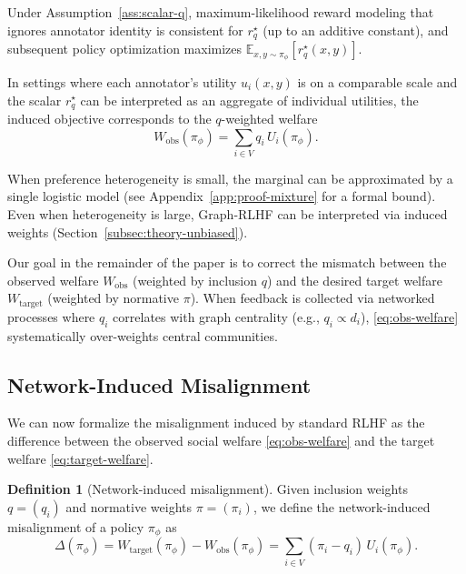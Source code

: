 \documentclass{article}
\theoremstyle{plain}
\theoremstyle{definition}
\newtheorem{definition}[theorem]{Definition}
\theoremstyle{remark}
\begin{document}
Under Assumption~\ref{ass:scalar-q}, maximum-likelihood reward modeling that
ignores annotator identity is consistent for $r_q^\star$ (up to an additive
constant), and subsequent policy optimization maximizes
$\mathbb{E}_{x, y \sim \pi_\phi}[r_q^\star(x,y)]$.

In settings where each annotator's utility $u_i(x,y)$ is on a comparable scale
and the scalar $r_q^\star$ can be interpreted as an aggregate of individual
utilities, the induced objective corresponds to the $q$-weighted welfare
\begin{equation}
    W_{\text{obs}}(\pi_\phi)
    =
    \sum_{i \in V} q_i \, U_i(\pi_\phi).
    \label{eq:obs-welfare}
\end{equation}

When preference heterogeneity is small, the marginal can be approximated by a single logistic model (see Appendix~\ref{app:proof-mixture} for a formal bound). Even when heterogeneity is large, Graph-RLHF can be interpreted via induced weights (Section~\ref{subsec:theory-unbiased}).

Our goal in the remainder of the paper is to correct the mismatch between
the observed welfare $W_{\text{obs}}$ (weighted by inclusion $q$) and the
desired target welfare $W_{\text{target}}$ (weighted by normative $\pi$).
When feedback is collected via networked processes where $q_i$ correlates with
graph centrality (e.g., $q_i \propto d_i$), \eqref{eq:obs-welfare}
systematically over-weights central communities.

\subsection{Network-Induced Misalignment}
\label{subsec:misalignment}

We can now formalize the misalignment induced by standard RLHF as the
difference between the observed social welfare \eqref{eq:obs-welfare}
and the target welfare \eqref{eq:target-welfare}.

\begin{definition}[Network-induced misalignment]
Given inclusion weights $q = (q_i)$ and normative weights $\pi = (\pi_i)$, we
define the network-induced misalignment of a policy $\pi_\phi$ as
\begin{equation}
    \Delta(\pi_\phi)
    =
    W_{\text{target}}(\pi_\phi)
    -
    W_{\text{obs}}(\pi_\phi)
    =
    \sum_{i \in V} (\pi_i - q_i) \, U_i(\pi_\phi).
    \label{eq:misalignment}
\end{equation}
\end{definition}
\end{document}
